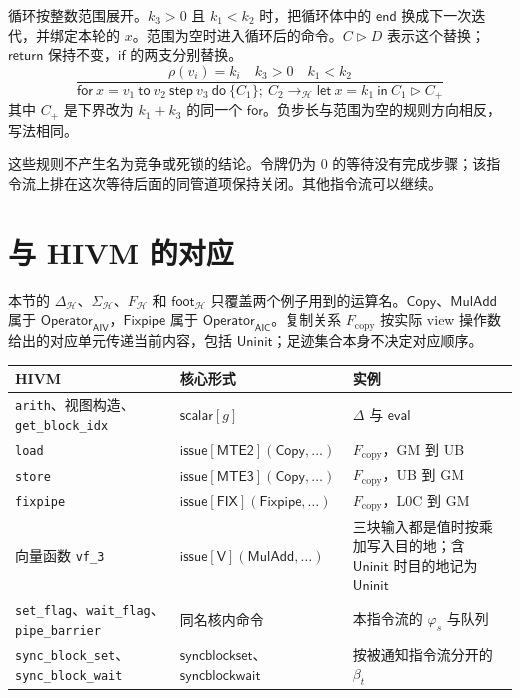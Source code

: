 \documentclass[UTF8,a4paper,11pt,fontset=fandol]{ctexart}
\newcommand{\kw}[1]{\ensuremath{\mathsf{#1}}}
\newcommand{\infer}[2]{\displaystyle\frac{\displaystyle #1}{\displaystyle #2}}
\begin{document}
循环按整数范围展开。$k_3>0$ 且 $k_1<k_2$ 时，把循环体中的 $\kw{end}$ 换成下一次迭代，并绑定本轮的 $x$。范围为空时进入循环后的命令。$C\triangleright D$ 表示这个替换；$\kw{return}$ 保持不变，$\kw{if}$ 的两支分别替换。
\[
\infer{
  \rho(v_i)=k_i
  \quad
  k_3>0
  \quad
  k_1<k_2
}{
  \kw{for}\ x=v_1\ \kw{to}\ v_2\ \kw{step}\ v_3\ \kw{do}\ \{C_1\};\ C_2
  \longrightarrow_{\mathcal H}
  \kw{let}\ x=k_1\ \kw{in}\ 
  C_1\triangleright C_{+}
}
\]
其中 $C_{+}$ 是下界改为 $k_1+k_3$ 的同一个 \kw{for}。负步长与范围为空的规则方向相反，写法相同。

这些规则不产生名为竞争或死锁的结论。令牌仍为 $0$ 的等待没有完成步骤；该指令流上排在这次等待后面的同管道项保持关闭。其他指令流可以继续。

\section{与 HIVM 的对应}

本节的 $\Delta_{\mathcal H}$、$\Sigma_{\mathcal H}$、$F_{\mathcal H}$ 和 $\mathsf{foot}_{\mathcal H}$ 只覆盖两个例子用到的运算名。$\kw{Copy}$、$\kw{MulAdd}$ 属于 $\mathsf{Operator}_{\mathsf{AIV}}$，$\kw{Fixpipe}$ 属于 $\mathsf{Operator}_{\mathsf{AIC}}$。复制关系 $F_{\mathrm{copy}}$ 按实际 view 操作数给出的对应单元传递当前内容，包括 $\mathsf{Uninit}$；足迹集合本身不决定对应顺序。

\begin{center}
\begin{tabularx}{\linewidth}{@{}llY@{}}
\toprule
HIVM & 核心形式 & 实例 \\
\midrule
\texttt{arith}、视图构造、\texttt{get\_block\_idx}
  & $\kw{scalar}[g]$
  & $\Delta$ 与 $\mathsf{eval}$ \\
\texttt{load}
  & $\kw{issue}[\mathsf{MTE2}](\kw{Copy},\ldots)$
  & $F_{\mathrm{copy}}$，GM 到 UB \\
\texttt{store}
  & $\kw{issue}[\mathsf{MTE3}](\kw{Copy},\ldots)$
  & $F_{\mathrm{copy}}$，UB 到 GM \\
\texttt{fixpipe}
  & $\kw{issue}[\mathsf{FIX}](\kw{Fixpipe},\ldots)$
  & $F_{\mathrm{copy}}$，L0C 到 GM \\
向量函数 \texttt{vf\_3}
  & $\kw{issue}[\mathsf{V}](\kw{MulAdd},\ldots)$
  & 三块输入都是值时按乘加写入目的地；含 $\mathsf{Uninit}$ 时目的地记为 $\mathsf{Uninit}$ \\
\texttt{set\_flag}、\texttt{wait\_flag}、\texttt{pipe\_barrier}
  & 同名核内命令
  & 本指令流的 $\varphi_s$ 与队列 \\
\texttt{sync\_block\_set}、\texttt{sync\_block\_wait}
  & $\kw{syncblockset}$、$\kw{syncblockwait}$
  & 按被通知指令流分开的 $\beta_t$ \\
\bottomrule
\end{tabularx}
\end{center}
\end{document}
